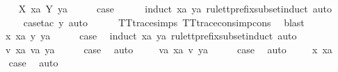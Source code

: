\isanewline
\ \ \isamarkupfalse%
\ {\isacharparenleft}{}\ X\ xa\ Y\ ya{\isacharparenright}\isanewline
\ \ \isamarkupfalse%
\ \isamarkupfalse%
\ {\isacharquery}case\isanewline
\ \ \ \ \isamarkupfalse%
\ {\isacharparenleft}induct\ xa\ ya\ rule{\isacharcolon}tt{\isacharunderscore}prefix{\isacharunderscore}subset{\isachardot}induct{\isacharcomma}\ auto{\isacharparenright}\isanewline
\ \ \ \ \isamarkupfalse%
\ {\isacharparenleft}case{\isacharunderscore}tac\ y{\isacharcomma}\ auto{\isacharparenright}\isanewline
\ \ \ \ \isamarkupfalse%
\ TT{}{\isacharunderscore}trace{\isachardot}simps{\isacharparenleft}{}{\isacharparenright}\ TT{}{\isacharunderscore}trace{\isacharunderscore}cons{\isacharunderscore}imp{\isacharunderscore}cons\ \isamarkupfalse%
\ blast\isanewline
{}\isamarkupfalse%
\isanewline
\ \ \isamarkupfalse%
\ {\isacharparenleft}{}\ x\ xa\ y\ ya{\isacharparenright}\isanewline
\ \ \isamarkupfalse%
\ \isamarkupfalse%
\ {\isacharquery}case\ \isamarkupfalse%
\ {\isacharparenleft}induct\ xa\ ya\ rule{\isacharcolon}tt{\isacharunderscore}prefix{\isacharunderscore}subset{\isachardot}induct{\isacharcomma}\ auto{\isacharparenright}\isanewline
{}\isamarkupfalse%
\isanewline
\ \ \isamarkupfalse%
\ {\isacharparenleft}{\isachardoublequoteopen}{}{\isacharunderscore}{}{\isachardoublequoteclose}\ v\ xa\ va\ ya{\isacharparenright}\isanewline
\ \ \isamarkupfalse%
\ \isamarkupfalse%
\ {\isacharquery}case\ \isamarkupfalse%
\ auto\isanewline
{}\isamarkupfalse%
\isanewline
\ \ \isamarkupfalse%
\ {\isacharparenleft}{\isachardoublequoteopen}{}{\isacharunderscore}{}{\isachardoublequoteclose}\ va\ xa\ v\ ya{\isacharparenright}\isanewline
\ \ \isamarkupfalse%
\ \isamarkupfalse%
\ {\isacharquery}case\ \isamarkupfalse%
\ auto\isanewline
{}\isamarkupfalse%
\isanewline
\ \ \isamarkupfalse%
\ {\isacharparenleft}{}\ x\ xa{\isacharparenright}\isanewline
\ \ \isamarkupfalse%
\ \isamarkupfalse%
\ {\isacharquery}case\ \isamarkupfalse%
\ auto\isanewline
{}\isamarkupfalse%
%
\endisatagproof
{\isafoldproof}%
%
\isadelimproof
\isanewline
